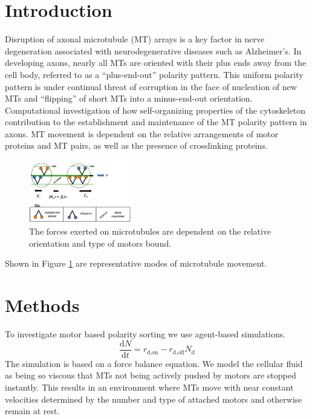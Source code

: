 \documentclass[]{biophysicist}
\begin{document}
\section{Introduction}
Disruption of axonal microtubule (MT) arrays is a key factor in nerve degeneration associated with neurodegenerative diseases such as Alzheimer’s. In developing axons, nearly all MTs are oriented with their plus ends away from the cell body, referred to as a “plus-end-out” polarity pattern. This uniform polarity pattern is under continual threat of corruption in the face of nucleation of new MTs and ``flipping'' of short MTs into a minus-end-out orientation. Computational investigation of how self-organizing properties of the cytoskeleton contribution to the establishment and maintenance of the MT polarity pattern in axons. MT movement is dependent on the relative arrangements of motor proteins and MT pairs, as well as the presence of crosslinking proteins.

\begin{figure}
    \centering
    \includegraphics[width=0.4\textwidth]{figures/model1.png}
    \caption{The forces exerted on microtubules are dependent on the relative orientation and type of motors bound.}
    \label{fig:mtmovement}
\end{figure}

Shown in Figure \ref{fig:mtmovement} are representative modes of microtubule movement.

\section{Methods}
To investigate motor based polarity sorting we use agent-based simulations.
\begin{equation}
    \frac{\text{d}N}{\text{d}{t}} = r_{\text{d,on}} - r_{\text{d,off}} N_{\text{d}}
\end{equation}
The simulation is based on a force balance equation. We model the cellular fluid as being so viscous that MTs not being actively pushed by motors are stopped instantly. This results in an environment where MTs move with near constant velocities determined by the number and type of attached motors and otherwise remain at rest.
\end{document}
